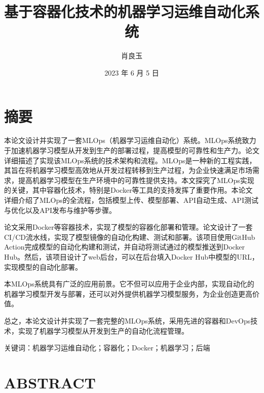 \documentclass{HDU-Bachelor-Thesis}
\title{基于容器化技术的机器学习运维自动化系统}
\author{肖良玉}
\date{2023 年 6 月 5 日}
\begin{document}
\pagestyle{empty}

\maketitle
%

\clearpage

\section*{摘\hspace{2em}要}

本论文设计并实现了一套MLOps（机器学习运维自动化）系统。MLOps系统致力于加速机器学习模型从开发到生产的部署过程，提高模型的可靠性和生产力。论文详细描述了实现该MLOps系统的技术架构和流程。MLOps是一种新的工程实践，其旨在将机器学习模型高效地从开发过程转移到生产过程，为企业快速满足市场需求，提高机器学习模型在生产环境中的可靠性提供支持。本文探究了MLOps实现的关键，其中容器化技术，特别是Docker等工具的支持发挥了重要作用。本论文详细介绍了MLOps的全流程，包括模型上传、模型部署、API自动生成、API测试与优化以及API发布与维护等步骤。

论文采用Docker等容器技术，实现了模型的容器化部署和管理。论文设计了一套CI/CD流水线，实现了模型镜像的自动化构建、测试和部署。该项目使用GitHub Action完成模型的自动化构建和测试，并自动将测试通过的模型推送到Docker Hub。然后，该项目设计了web后台，可以在后台填入Docker Hub中模型的URL，实现模型的自动化部署。

本MLOps系统具有广泛的应用前景。它不但可以应用于企业内部，实现自动化的机器学习模型开发与部署，还可以对外提供机器学习模型服务，为企业创造更高价值。

总之，本论文设计并实现了一套完整的MLOps系统，采用先进的容器和DevOps技术，实现了机器学习模型从开发到生产的自动化流程管理。

\vspace{\baselineskip}\noindent
\textsf{关键词：}机器学习运维自动化；容器化；Docker；机器学习；后端

\clearpage
\section*{\textbf{ABSTRACT}}
\end{document}
